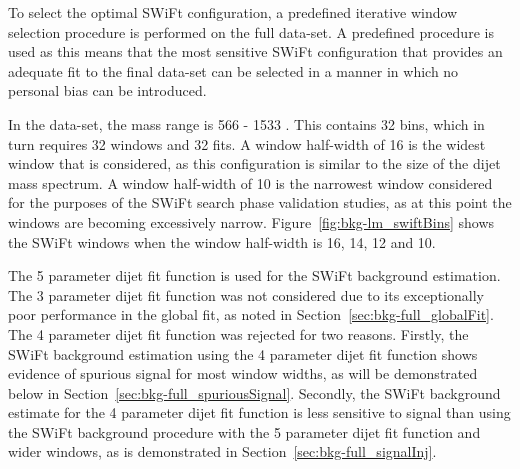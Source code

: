 To select the optimal SWiFt configuration, a predefined iterative window selection procedure is performed on the full \lm{} data-set.
A predefined procedure is used as this means that the most sensitive SWiFt configuration that provides an adequate fit to the final data-set can be selected
in a manner in which no personal bias can be introduced.




In the \lm{} data-set, the mass range is 566 - 1533 \GeV{}. This contains 32 bins, which in turn requires 32 windows and 32 fits.
A window half-width of 16 is  the widest window that is considered,
as this configuration is similar to the size of the dijet mass spectrum.
A window half-width of 10 is the narrowest window considered for the purposes of the SWiFt search phase validation studies,
as at this point the windows are becoming excessively narrow.
Figure~\ref{fig:bkg-lm_swiftBins} shows the SWiFt windows when the window half-width is 16, 14, 12 and 10.

The 5 parameter dijet fit function is used for the SWiFt background estimation.
The 3 parameter dijet fit function was not considered due to its exceptionally poor performance in the global fit, as noted in Section~\ref{sec:bkg-full_globalFit}.
The 4 parameter dijet fit function was rejected for two reasons.
Firstly, the SWiFt background estimation using the 4 parameter dijet fit function shows evidence of spurious signal for most window widths,
as will be demonstrated below in Section~\ref{sec:bkg-full_spuriousSignal}.
Secondly, the SWiFt background estimate for the 4 parameter dijet fit function is less sensitive to signal than
using the SWiFt background procedure with the 5 parameter dijet fit function and wider windows, as is demonstrated in Section~\ref{sec:bkg-full_signalInj}.

